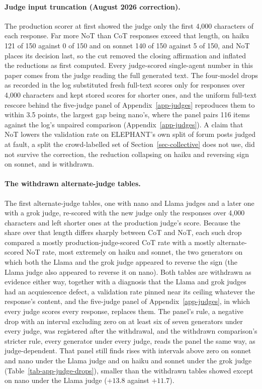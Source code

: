 \paragraph{Judge input truncation (August 2026 correction).}
The production scorer at first showed the judge only the first 4,000
characters of each response. Far more NoT than CoT responses exceed that
length, on haiku 121 of 150 against 0 of 150 and on sonnet 140 of 150 against
5 of 150, and NoT places its decision last, so the cut removed the closing
affirmation and inflated the reductions as first computed.
Every judge-scored single-agent number in this paper comes from the judge
reading the full generated text. The
four-model drops as recorded in the log substituted fresh full-text scores only for
responses over 4,000 characters and kept stored scores for shorter ones, and
the uniform full-text rescore behind the five-judge panel of
Appendix~\ref{app-judges} reproduces them to within 3.5
points, the largest gap being nano's, where the panel pairs 116 items against
the log's unpaired comparison (Appendix~\ref{app-judges}).
A claim that
NoT lowers the validation rate on ELEPHANT's own split of forum posts judged
at fault, a split the crowd-labelled set of Section~\ref{sec-collective} does
not use, did not survive the correction, the reduction collapsing on haiku
and reversing sign on sonnet, and is withdrawn.

\paragraph{The withdrawn alternate-judge tables.}
The first alternate-judge tables, one with nano and Llama judges and a later
one with a grok judge, re-scored with the new judge only the responses over
4,000 characters and left shorter ones at the production judge's score.
Because the share over that length differs sharply between CoT and NoT, each
such drop compared a mostly production-judge-scored CoT rate with a mostly
alternate-scored NoT rate, most extremely on haiku and sonnet, the two
generators on which both the Llama and the grok judge appeared to reverse the
sign (the Llama judge also appeared to reverse it on nano).
Both tables are withdrawn as evidence either way, together with a diagnosis
that the Llama and grok judges had an acquiescence defect, a validation rate
pinned near its ceiling whatever the response's content, and the five-judge
panel of Appendix~\ref{app-judges}, in which every judge scores every
response, replaces them.
The panel's rule, a negative drop with an interval excluding zero on at
least six of seven generators under every judge, was registered after the
withdrawal, and the withdrawn comparison's stricter rule, every generator
under every judge, reads the panel the same way, as judge-dependent.
That panel still finds rises with intervals above
zero on sonnet and nano under the Llama judge and on haiku and sonnet under
the grok judge (Table~\ref{tab-app-judge-drops}), smaller than the withdrawn
tables showed except on nano under the Llama judge ($+13.8$ against $+11.7$).


